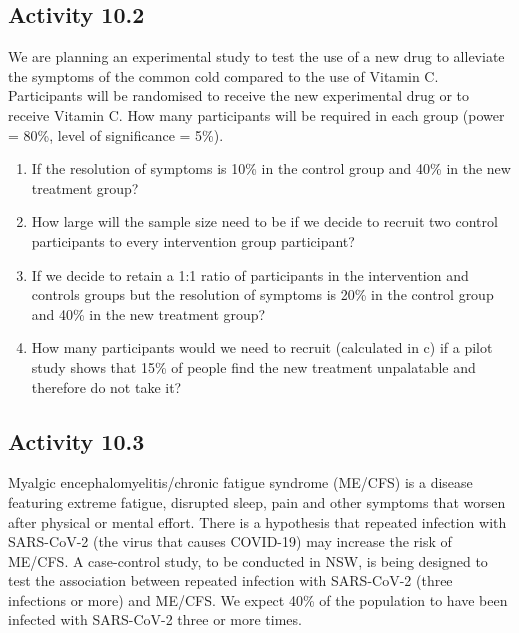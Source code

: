\documentclass[
  a4paper,
]{memoir}
\providecommand{\tightlist}{%
  \setlength{\itemsep}{0pt}\setlength{\parskip}{0pt}}
\begin{document}
\subsection*{Activity 10.2}\label{activity-10.2}

We are planning an experimental study to test the use of a new drug to
alleviate the symptoms of the common cold compared to the use of Vitamin
C. Participants will be randomised to receive the new experimental drug
or to receive Vitamin C. How many participants will be required in each
group (power = 80\%, level of significance = 5\%).

\begin{enumerate}
\def\labelenumi{\alph{enumi})}
\tightlist
\item
  If the resolution of symptoms is 10\% in the control group and 40\% in
  the new treatment group?
\item
  How large will the sample size need to be if we decide to recruit two
  control participants to every intervention group participant?
\item
  If we decide to retain a 1:1 ratio of participants in the intervention
  and controls groups but the resolution of symptoms is 20\% in the
  control group and 40\% in the new treatment group?
\item
  How many participants would we need to recruit (calculated in c) if a
  pilot study shows that 15\% of people find the new treatment
  unpalatable and therefore do not take it?
\end{enumerate}

\subsection*{Activity 10.3}\label{activity-10.3}

Myalgic encephalomyelitis/chronic fatigue syndrome (ME/CFS) is a disease
featuring extreme fatigue, disrupted sleep, pain and other symptoms that
worsen after physical or mental effort. There is a hypothesis that
repeated infection with SARS-CoV-2 (the virus that causes COVID-19) may
increase the risk of ME/CFS. A case-control study, to be conducted in
NSW, is being designed to test the association between repeated
infection with SARS-CoV-2 (three infections or more) and ME/CFS. We
expect 40\% of the population to have been infected with SARS-CoV-2
three or more times.
\end{document}
